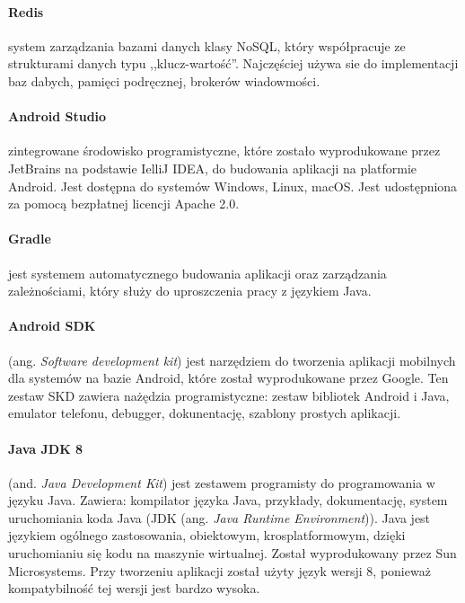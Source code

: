 \paragraph{Redis} \cite{redis} system zarządzania bazami danych klasy NoSQL, który współpracuje ze strukturami danych typu ,,klucz-wartość''. Najczęściej używa sie do implementacji baz dabych, pamięci podręcznej, brokerów wiadowmości.

\paragraph{Android Studio} \cite{android_doc,android_studio} zintegrowane środowisko programistyczne, które zostało wyprodukowane przez JetBrains na podstawie IelliJ IDEA, do budowania aplikacji na platformie Android. Jest dostępna do systemów Windows, Linux, macOS. Jest udostępniona za pomocą bezpłatnej licencji Apache 2.0.

\paragraph{Gradle} \cite{gradle,gradle_android_doc} jest systemem automatycznego budowania aplikacji oraz zarządzania zależnościami, który służy do uproszczenia pracy z językiem Java.

\paragraph{Android SDK} \cite{android_studio} (ang. \textit{Software development kit}) jest narzędziem do tworzenia aplikacji mobilnych dla systemów na bazie Android, które został wyprodukowane przez Google.
Ten zestaw SKD zawiera nażędzia programistyczne: zestaw bibliotek Android i Java, emulator telefonu, debugger, dokunentację, szablony prostych aplikacji.

\paragraph{Java JDK 8} (and. \textit{Java Development Kit}) \cite{java_doc} jest zestawem programisty do programowania w języku Java. Zawiera: kompilator języka Java, przykłady, dokumentację, system uruchomiania koda Java (JDK (ang. \textit{Java Runtime Environment})).
Java jest językiem ogólnego zastosowania, obiektowym, krosplatformowym, dzięki uruchomianiu się kodu na maszynie wirtualnej. Został wyprodukowany przez Sun Microsystems.
Przy tworzeniu aplikacji został użyty język wersji 8, ponieważ kompatybilność tej wersji jest bardzo wysoka.

